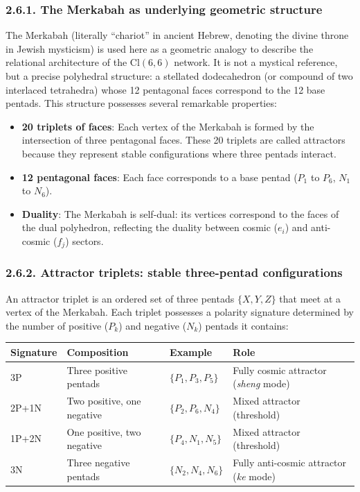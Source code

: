 \documentclass[11pt]{article}
\providecommand{\tightlist}{\setlength{\itemsep}{2pt}\setlength{\parskip}{6pt}}
\providecommand{\tightlist}{%
  \setlength{\itemsep}{2pt}\setlength{\parskip}{6pt}
}
\begin{document}
\hypertarget{the-merkabah-as-underlying-geometric-structure}{%
\subsubsection{2.6.1. The Merkabah as underlying geometric
structure}\label{the-merkabah-as-underlying-geometric-structure}}

The Merkabah (literally ``chariot'' in ancient Hebrew, denoting the
divine throne in Jewish mysticism) is used here as a geometric analogy
to describe the relational architecture of the \(\text{Cl}(6,6)\)
network. It is not a mystical reference, but a precise polyhedral
structure: a stellated dodecahedron (or compound of two interlaced
tetrahedra) whose 12 pentagonal faces correspond to the 12 base pentads.
This structure possesses several remarkable properties:

\begin{itemize}
\tightlist
\item
  \textbf{20 triplets of faces}: Each vertex of the Merkabah is formed
  by the intersection of three pentagonal faces. These 20 triplets are
  called attractors because they represent stable configurations where
  three pentads interact.
\item
  \textbf{12 pentagonal faces}: Each face corresponds to a base pentad
  (\(P_1\) to \(P_6\), \(N_1\) to \(N_6\)).
\item
  \textbf{Duality}: The Merkabah is self-dual: its vertices correspond
  to the faces of the dual polyhedron, reflecting the duality between
  cosmic (\(e_i\)) and anti-cosmic (\(f_j\)) sectors.
\end{itemize}

\hypertarget{attractor-triplets-stable-three-pentad-configurations}{%
\subsubsection{2.6.2. Attractor triplets: stable three-pentad
configurations}\label{attractor-triplets-stable-three-pentad-configurations}}

An attractor triplet is an ordered set of three pentads \(\{X, Y, Z\}\)
that meet at a vertex of the Merkabah. Each triplet possesses a polarity
signature determined by the number of positive (\(P_k\)) and negative
(\(N_k\)) pentads it contains:

\begin{table}[H]
\centering
\begin{tabular}{@{}llll@{}}
\toprule
Signature & Composition & Example & Role \\
\midrule
3P & Three positive pentads & $\{P_1, P_3, P_5\}$ & Fully cosmic attractor (\textit{sheng} mode) \\
2P+1N & Two positive, one negative & $\{P_2, P_6, N_4\}$ & Mixed attractor (threshold) \\
1P+2N & One positive, two negative & $\{P_4, N_1, N_5\}$ & Mixed attractor (threshold) \\
3N & Three negative pentads & $\{N_2, N_4, N_6\}$ & Fully anti-cosmic attractor (\textit{ke} mode) \\
\bottomrule
\end{tabular}
\end{table}
\end{document}
